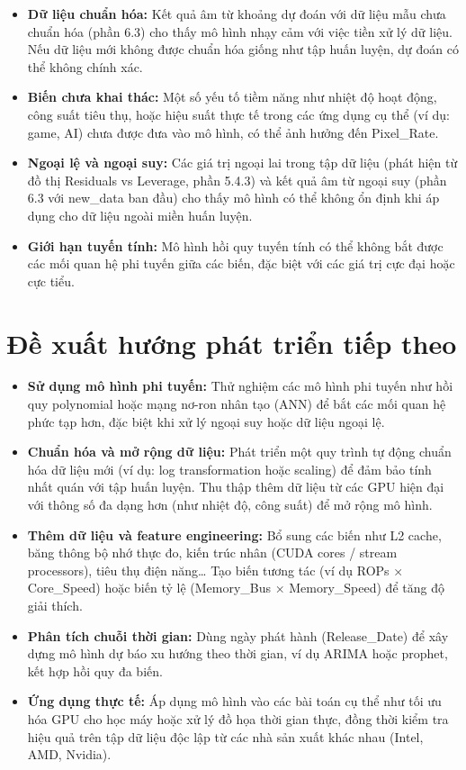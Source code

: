 \begin{itemize}
    \item \textbf{Dữ liệu chuẩn hóa:} Kết quả âm từ khoảng dự đoán với dữ liệu mẫu chưa chuẩn hóa (phần 6.3) cho thấy mô hình nhạy cảm với việc tiền xử lý dữ liệu. Nếu dữ liệu mới không được chuẩn hóa giống như tập huấn luyện, dự đoán có thể không chính xác.
    \item \textbf{Biến chưa khai thác:} Một số yếu tố tiềm năng như nhiệt độ hoạt động, công suất tiêu thụ, hoặc hiệu suất thực tế trong các ứng dụng cụ thể (ví dụ: game, AI) chưa được đưa vào mô hình, có thể ảnh hưởng đến Pixel\_Rate.
    \item \textbf{Ngoại lệ và ngoại suy:} Các giá trị ngoại lai trong tập dữ liệu (phát hiện từ đồ thị Residuals vs Leverage, phần 5.4.3) và kết quả âm từ ngoại suy (phần 6.3 với new\_data ban đầu) cho thấy mô hình có thể không ổn định khi áp dụng cho dữ liệu ngoài miền huấn luyện.
    \item \textbf{Giới hạn tuyến tính:} Mô hình hồi quy tuyến tính có thể không bắt được các mối quan hệ phi tuyến giữa các biến, đặc biệt với các giá trị cực đại hoặc cực tiểu.
\end{itemize}


\section{Đề xuất hướng phát triển tiếp theo}

\begin{itemize}
    \item \textbf{Sử dụng mô hình phi tuyến:} Thử nghiệm các mô hình phi tuyến như hồi quy polynomial hoặc mạng nơ-ron nhân tạo (ANN) để bắt các mối quan hệ phức tạp hơn, đặc biệt khi xử lý ngoại suy hoặc dữ liệu ngoại lệ.
    \item \textbf{Chuẩn hóa và mở rộng dữ liệu:} Phát triển một quy trình tự động chuẩn hóa dữ liệu mới (ví dụ: log transformation hoặc scaling) để đảm bảo tính nhất quán với tập huấn luyện. Thu thập thêm dữ liệu từ các GPU hiện đại với thông số đa dạng hơn (như nhiệt độ, công suất) để mở rộng mô hình.
    \item \textbf{Thêm dữ liệu và feature engineering:} Bổ sung các biến như L2 cache, băng thông bộ nhớ thực đo, kiến trúc nhân (CUDA cores / stream processors), tiêu thụ điện năng… Tạo biến tương tác (ví dụ ROPs × Core\_Speed) hoặc biến tỷ lệ (Memory\_Bus × Memory\_Speed) để tăng độ giải thích.
    \item \textbf{Phân tích chuỗi thời gian:} Dùng ngày phát hành (Release\_Date) để xây dựng mô hình dự báo xu hướng theo thời gian, ví dụ ARIMA hoặc prophet, kết hợp hồi quy đa biến.
    \item \textbf{Ứng dụng thực tế:} Áp dụng mô hình vào các bài toán cụ thể như tối ưu hóa GPU cho học máy hoặc xử lý đồ họa thời gian thực, đồng thời kiểm tra hiệu quả trên tập dữ liệu độc lập từ các nhà sản xuất khác nhau (Intel, AMD, Nvidia).
\end{itemize}
